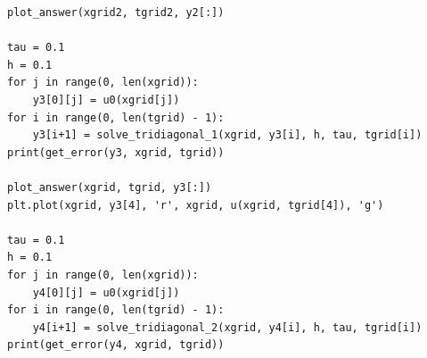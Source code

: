 \documentclass{article}%
\begin{document}
\begin{enumerate}
\begin{scriptsize}
\begin{verbatim}
plot_answer(xgrid2, tgrid2, y2[:])

tau = 0.1
h = 0.1
for j in range(0, len(xgrid)):
    y3[0][j] = u0(xgrid[j])
for i in range(0, len(tgrid) - 1):
    y3[i+1] = solve_tridiagonal_1(xgrid, y3[i], h, tau, tgrid[i])
print(get_error(y3, xgrid, tgrid))

plot_answer(xgrid, tgrid, y3[:])
plt.plot(xgrid, y3[4], 'r', xgrid, u(xgrid, tgrid[4]), 'g')

tau = 0.1
h = 0.1
for j in range(0, len(xgrid)):
    y4[0][j] = u0(xgrid[j])   
for i in range(0, len(tgrid) - 1):
    y4[i+1] = solve_tridiagonal_2(xgrid, y4[i], h, tau, tgrid[i])
print(get_error(y4, xgrid, tgrid))
\end{verbatim}
\end{scriptsize}

\end{enumerate}%
\end{document}
